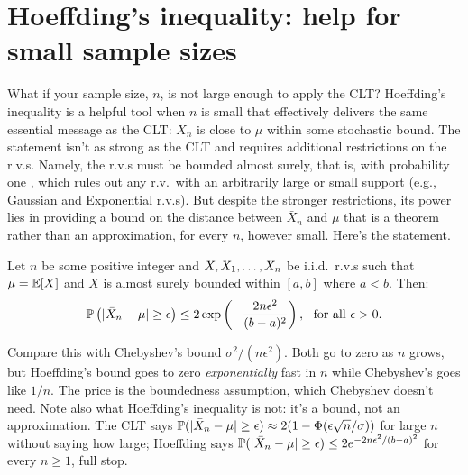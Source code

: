 \section{Hoeffding's inequality: help for small sample sizes}
\label{sec:hoeffding}

What if your sample size, $n$, is not large enough to apply the CLT?
Hoeffding's inequality is a helpful tool when $n$ is small that effectively delivers the same essential message as the CLT: $\bar{X}_n$ is close to $\mu$ within some stochastic bound.
The statement isn't as strong as the CLT and requires additional restrictions on the r.v.s.
Namely, the r.v.s must be bounded almost surely, that is, with probability one , which rules out any r.v.\ with an arbitrarily large or small support (e.g., Gaussian and Exponential r.v.s).
But despite the stronger restrictions, its power lies in providing a bound on the distance between $\bar{X}_n$ and $\mu$ that is a theorem rather than an approximation, for every $n$, however small.
Here's the statement.

\begin{theorem}
\label{thm:hoeffding}
Let $n$ be some positive integer and $X, X_1, \ldots, X_n$ be i.i.d.\ r.v.s such that $\mu = \operatorname*{\mathbb{E}}[X]$ and $X$ is almost surely bounded within $[a,b]$ where $a < b$.
Then:
\[
\mathbb{P}\left( \lvert \bar{X}_n - \mu \rvert \geq \epsilon \right) \leq 2 \exp \left( - \frac{2n\epsilon^2}{(b-a)^2} \right), \, \, \text{ for all } \epsilon > 0.
\]
\end{theorem}

Compare this with Chebyshev's bound $\sigma^2/(n \epsilon^2)$.
Both go to zero as $n$ grows, but Hoeffding's bound goes to zero \textit{exponentially} fast in $n$ while Chebyshev's goes like $1/n$.
The price is the boundedness assumption, which Chebyshev doesn't need.
Note also what Hoeffding's inequality is not: it's a bound, not an approximation.
The CLT says $\mathbb{P}(\lvert\bar{X}_n - \mu\rvert \geq \epsilon) \approx 2(1 - \Phi(\epsilon \sqrt{n}/\sigma))$ for large $n$ without saying how large; Hoeffding says $\mathbb{P}(\lvert\bar{X}_n - \mu\rvert \geq \epsilon) \leq 2e^{-2n\epsilon^2/(b-a)^2}$ for every $n \geq 1$, full stop.

